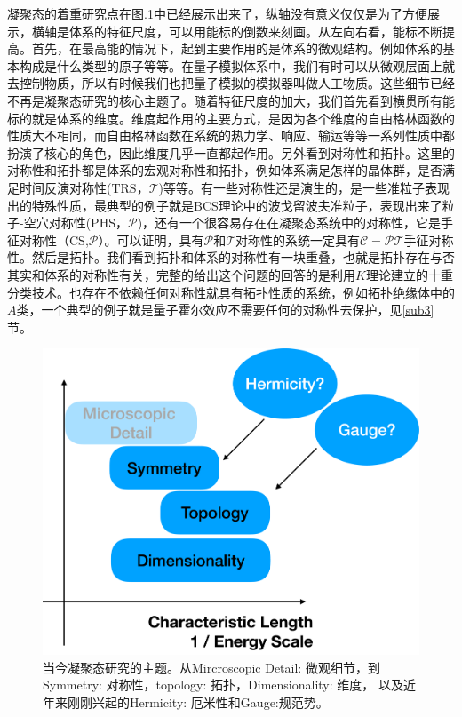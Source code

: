 \documentclass[supercite]{HustGraduPaper}
\begin{document}
  凝聚态的着重研究点在图.\ref{fig:cmt}中已经展示出来了，纵轴没有意义仅仅是为了方便展示，横轴是体系的特征尺度，可以用能标的倒数来刻画。从左向右看，能标不断提高。首先，在最高能的情况下，起到主要作用的是体系的微观结构。例如体系的基本构成是什么类型的原子等等。在量子模拟体系中，我们有时可以从微观层面上就去控制物质，所以有时候我们也把量子模拟的模拟器叫做人工物质。这些细节已经不再是凝聚态研究的核心主题了。随着特征尺度的加大，我们首先看到横贯所有能标的就是体系的维度。维度起作用的主要方式，是因为各个维度的自由格林函数的性质大不相同，而自由格林函数在系统的热力学、响应、输运等等一系列性质中都扮演了核心的角色，因此维度几乎一直都起作用。另外看到对称性和拓扑。这里的对称性和拓扑都是体系的宏观对称性和拓扑，例如体系满足怎样的晶体群，是否满足时间反演对称性(TRS，$\mathcal{T}$)等等。有一些对称性还是演生的，是一些准粒子表现出的特殊性质，最典型的例子就是BCS理论中的波戈留波夫准粒子，表现出来了粒子-空穴对称性(PHS，$\mathcal{P}$)，还有一个很容易存在在凝聚态系统中的对称性，它是手征对称性（CS,$\mathcal{P}$）。可以证明，具有$\mathcal{P}$和$\mathcal{T}$对称性的系统一定具有$\mathcal{C} = \mathcal{PT}$手征对称性。然后是拓扑。我们看到拓扑和体系的对称性有一块重叠，也就是拓扑存在与否其实和体系的对称性有关，完整的给出这个问题的回答的是利用$K$理论建立的十重分类技术。也存在不依赖任何对称性就具有拓扑性质的系统，例如拓扑绝缘体中的$A$类，一个典型的例子就是量子霍尔效应不需要任何的对称性去保护，见\ref{sub3}节。
\begin{figure}
	\centering
	\includegraphics[width=1\linewidth]{Figures/topoinsu/cmt}
	\caption{当今凝聚态研究的主题。从Mircroscopic Detail: 微观细节，到Symmetry: 对称性，topology: 拓扑，Dimensionality: 维度， 以及近年来刚刚兴起的Hermicity: 厄米性和Gauge:规范势。}
	\label{fig:cmt}
\end{figure}
\end{document}

